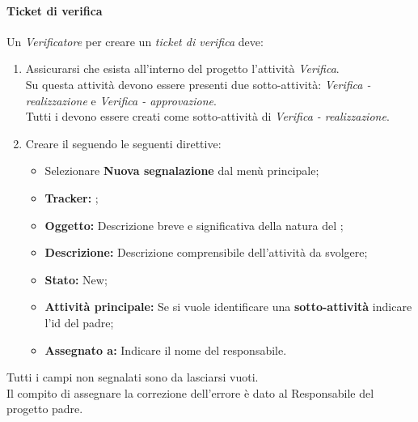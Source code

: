             \paragraph{Ticket di verifica}
              Un \emph{Verificatore} per creare un \emph{ticket di verifica} deve:
              \begin{enumerate}
                \item Assicurarsi che esista all'interno del progetto l'attività \emph{Verifica}.\\
                Su questa attività devono essere presenti due sotto-attività: \emph{Verifica - realizzazione} e \emph{Verifica - approvazione}.\\
                Tutti i  devono essere creati come sotto-attività di \emph{Verifica - realizzazione}.
                \item Creare il  seguendo le seguenti direttive:
                \bgroup
                  \begin{itemize}
                    \item Selezionare \textbf{Nuova segnalazione} dal menù principale;
                    \item \textbf{Tracker: };
                    \item \textbf{Oggetto: }Descrizione breve e significativa della natura del ;
                    \item \textbf{Descrizione: }Descrizione comprensibile dell'attività da svolgere;
                    \item \textbf{Stato: }New;
                    \item \textbf{Attività principale: }Se si vuole identificare una \textbf{sotto-attività} indicare l'id del  padre;
                    \item \textbf{Assegnato a: }Indicare il nome del responsabile.
                  \end{itemize}
                \egroup
              \end{enumerate}
            Tutti i campi non segnalati sono da lasciarsi vuoti.\\
            Il compito di assegnare la correzione dell'errore è dato al Responsabile del progetto padre.
